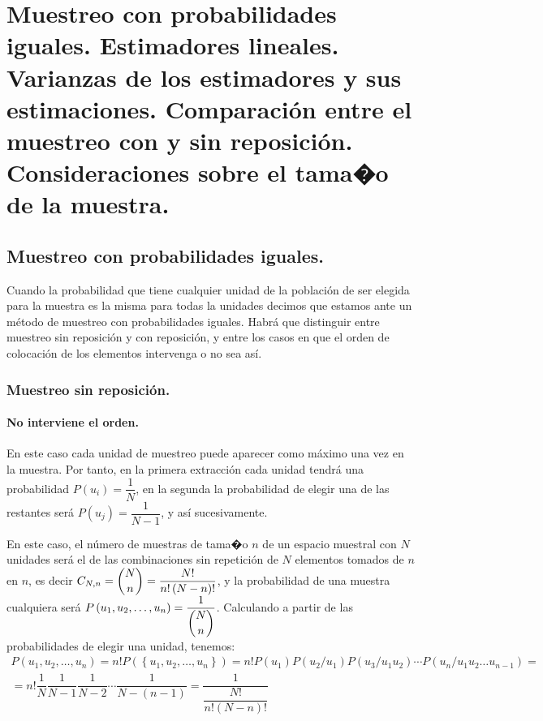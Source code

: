 %

\chapter{Muestreo con probabilidades iguales. Estimadores lineales. Varianzas
de los estimadores y sus estimaciones. Comparaci\'on entre el muestreo
con y sin reposici\'on. Consideraciones sobre el tama�o de la muestra.}


\section{Muestreo con probabilidades iguales.}

Cuando la probabilidad que tiene cualquier unidad de la poblaci\'on
de ser elegida para la muestra es la misma para todas la unidades
decimos que estamos ante un m\'etodo de muestreo con probabilidades
iguales. Habr\'a que distinguir entre muestreo sin reposici\'on y con
reposici\'on, y entre los casos en que el orden de colocaci\'on de los
elementos intervenga o no sea as\'i.


\subsection{Muestreo sin reposici\'on.}


\subsubsection{No interviene el orden.}

En este caso cada unidad de muestreo puede aparecer como m\'aximo una
vez en la muestra. Por tanto, en la primera extracci\'on cada unidad
tendr\'a una probabilidad $P\left(u_{i}\right)=\dfrac{1}{N}$, en la
segunda la probabilidad de elegir una de las restantes ser\'a $P\left(u_{j}\right)=\dfrac{1}{N-1}$,
y as\'i sucesivamente.

En este caso, el n\'umero de muestras de tama�o $n$ de un espacio muestral
con $N$ unidades ser\'a el de las combinaciones sin repetici\'on de $N$
elementos tomados de $n$ en $n$, es decir $C_{N,n}=\dbinom{N}{n}=\dfrac{N!}{n!\left(N-n\right)!}$,
y la probabilidad de una muestra cualquiera ser\'a $P\left(u_{1},u_{2},\ldots,u_{n}\right)=\dfrac{1}{\dbinom{N}{n}}$.
Calculando a partir de las probabilidades de elegir una unidad, tenemos:
\[
\begin{array}{c}
P\left(u_{1},u_{2},\ldots,u_{n}\right)=n!P\left(\left\{ u_{1},u_{2},\ldots,u_{n}\right\} \right)=n!P\left(u_{1}\right)P\left(u_{2}/u_{1}\right)P\left(u_{3}/u_{1}u_{2}\right)\cdots P\left(u_{n}/u_{1}u_{2}\ldots u_{n-1}\right)=\\
=n!\dfrac{1}{N}\dfrac{1}{N-1}\dfrac{1}{N-2}\cdots\dfrac{1}{N-\left(n-1\right)}=\dfrac{1}{\dfrac{N!}{n!\left(N-n\right)!}}
\end{array}
\]


